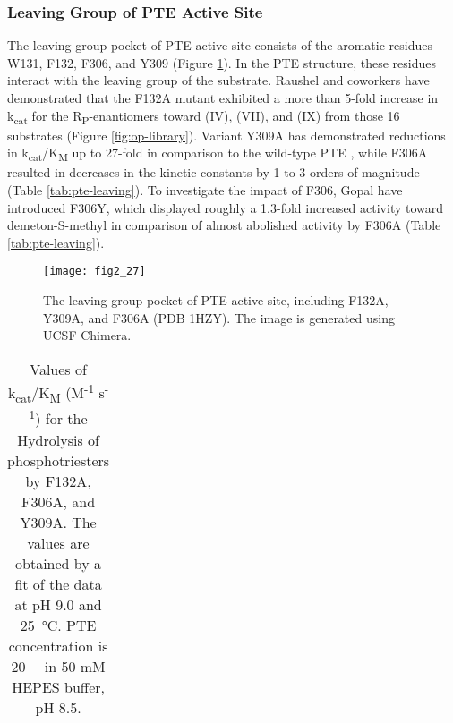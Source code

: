 \begin{refsection}
\subsubsection{Leaving Group of PTE Active Site}

The leaving group pocket of PTE active site consists of the aromatic residues
W131, F132, F306, and Y309 \cite{Hanusa2011} (Figure \ref{fig:leaving-group}).
In the PTE structure, these residues interact with the leaving group of the
substrate. Raushel and coworkers have demonstrated that the F132A mutant
exhibited a more than 5-fold increase in k\textsubscript{cat} for the
R\textsubscript{P}-enantiomers toward (IV), (VII), and (IX) from those 16
substrates \cite{Chen-Goodspeed2001a} (Figure \ref{fig:op-library}). Variant
Y309A has demonstrated reductions in k\textsubscript{cat}/K\textsubscript{M} up
to 27-fold in comparison to the wild-type PTE \cite{Chen-Goodspeed2001a}, while
F306A resulted in decreases in the kinetic constants by 1 to 3
orders of magnitude \cite{Chen-Goodspeed2001a} (Table \ref{tab:pte-leaving}). To
investigate the impact of F306, Gopal  have introduced F306Y,
which displayed roughly a 1.3-fold increased activity toward demeton-S-methyl
in comparison of almost abolished activity by F306A \cite{Gopal2000} (Table
\ref{tab:pte-leaving}). 
\begin{figure}[htbp] \centering \texttt{[image: fig2\_27]}
    \caption[The leaving group pocket of PTE active site, including F132A,
    Y309A, and F306A (PDB 1HZY). The image is generated using UCSF Chimera.]
    {The leaving group pocket of PTE active site, including  F132A, Y309A, and
        F306A (PDB 1HZY). The image is generated using UCSF Chimera.}
    \label{fig:leaving-group}
\end{figure}
\begin{table}[htbp]
    \centering
    \caption[Values of k\textsubscript{cat}/K\textsubscript{M}
    (M\textsuperscript{-1} s\textsuperscript{-1}) for the Hydrolysis of
    phosphotriesters by F132A, F306A, and Y309A. The values are obtained by a
    fit of the data at pH 9.0 and \SI{25}{\celsius}. PTE concentration is
    \SI{20}{\nano\Molar} in 50 mM HEPES buffer, pH 8.5.] {Values of
        k\textsubscript{cat}/K\textsubscript{M} (M\textsuperscript{-1}
        s\textsuperscript{-1}) for the Hydrolysis of phosphotriesters by F132A,
        F306A, and Y309A.  The values are obtained by a fit of the data at pH
        9.0 and \SI{25}{\celsius}. PTE concentration is \SI{20}{\nano\Molar} in
    50 mM HEPES buffer, pH 8.5.}
    \begin{tabular}{lllllll}
    \hline


\end{tabular}
\end{table}
\end{refsection}
